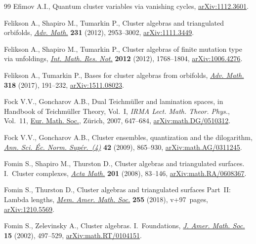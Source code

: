 \documentclass[11pt]{article}
\numberwithin{equation}{section}
\begin{document}
\begin{thebibliography}{99}
Efimov A.I., Quantum cluster variables via vanishing cycles,
 \href{https://arxiv.org/abs/1112.3601}{arXiv:1112.3601}.

Felikson A., Shapiro M., Tumarkin P., Cluster algebras and triangulated
 orbifolds, \href{https://doi.org/10.1016/j.aim.2012.07.032}{\textit{Adv. Math.}} \textbf{231} (2012), 2953--3002,
 \href{https://arxiv.org/abs/1111.3449}{arXiv:1111.3449}.

Felikson A., Shapiro M., Tumarkin P., Cluster algebras of finite mutation type
 via unfoldings, \href{https://doi.org/10.1093/imrn/rnr072}{\textit{Int. Math. Res. Not.}} \textbf{2012} (2012),
 1768--1804, \href{https://arxiv.org/abs/1006.4276}{arXiv:1006.4276}.

Felikson A., Tumarkin P., Bases for cluster algebras from orbifolds,
 \href{https://doi.org/10.1016/j.aim.2017.07.025}{\textit{Adv. Math.}} \textbf{318} (2017), 191--232, \href{https://arxiv.org/abs/1511.08023}{arXiv:1511.08023}.

Fock V.V., Goncharov A.B., Dual {T}eichm\"uller and lamination spaces, in
 Handbook of {T}eichm\"uller Theory, {V}ol.~{I}, \textit{IRMA Lect. Math.
 Theor. Phys.}, Vol.~11, \href{https://doi.org/10.4171/029-1/16}{Eur. Math. Soc.}, Z\"urich, 2007, 647--684,
 \href{https://arxiv.org/abs/math.DG/0510312}{arXiv:math.DG/0510312}.

Fock V.V., Goncharov A.B., Cluster ensembles, quantization and the dilogarithm,
 \href{https://doi.org/10.24033/asens.2112}{\textit{Ann. Sci. \'Ec. Norm. Sup\'er.~(4)}} \textbf{42} (2009), 865--930,
 \href{https://arxiv.org/abs/math.AG/0311245}{arXiv:math.AG/0311245}.

Fomin S., Shapiro M., Thurston D., Cluster algebras and triangulated surfaces.
 {I}.~{C}luster complexes, \href{https://doi.org/10.1007/s11511-008-0030-7}{\textit{Acta Math.}} \textbf{201} (2008), 83--146,
 \href{https://arxiv.org/abs/math.RA/0608367}{arXiv:math.RA/0608367}.

Fomin S., Thurston D., Cluster algebras and triangulated surfaces {P}art~{II}:
 {L}ambda lengths, \href{https://doi.org/10.1090/memo/1223}{\textit{Mem. Amer. Math. Soc.}} \textbf{255} (2018),
 v+97~pages, \href{https://arxiv.org/abs/1210.5569}{arXiv:1210.5569}.

Fomin S., Zelevinsky A., Cluster algebras. {I}.~{F}oundations, \href{https://doi.org/10.1090/S0894-0347-01-00385-X}{\textit{J. Amer.
 Math. Soc.}} \textbf{15} (2002), 497--529, \href{https://arxiv.org/abs/math.RT/0104151}{arXiv:math.RT/0104151}.


\end{thebibliography}
\end{document}
